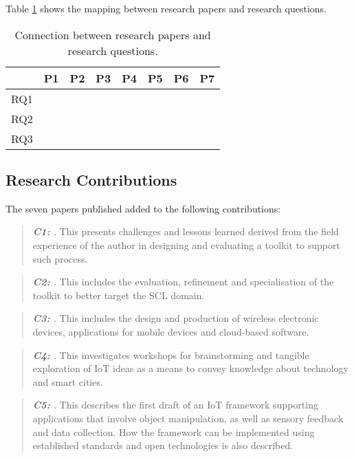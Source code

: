 Table \ref{tab:rq-papers-relation} shows the mapping between research papers and research questions.

\begin{table}
	[tbh] \centering \caption{Connection between research papers and research questions.} \label{tab:rq-papers-relation}
	\begin{tabular}
		{cccccccc} \toprule  & P1 & P2 & P3 & P4 & P5 & P6 & P7 \\
		\midrule 
		RQ1 & & \textbullet & \textbullet & & & \textbullet & \textbullet \\
		RQ2 & \textbullet & \textbullet & \textbullet & \textbullet & \textbullet & &  \\
		RQ3 & & & & & & \textbullet & \textbullet \\
		\bottomrule
	\end{tabular}
\end{table}


\subsection{Research Contributions}
\label{sub:research-contributions}

The seven papers published added to the following contributions:

\begin{quote}
	\emph{\textbf{C1:} \Ci.} This presents challenges and lessons learned derived from the field experience of the author in designing and evaluating a toolkit to support such process.
\end{quote}
\begin{quote}
	\emph{\textbf{C2:} \Cii.} This includes the evaluation, refinement and specialisation of the toolkit to better target the SCL domain. 
\end{quote}
\begin{quote}
	\emph{\textbf{C3:} \Ciii.} This includes the design and production of wireless electronic devices, applications for mobile devices and cloud-based software. 
\end{quote}
\begin{quote}
	\emph{\textbf{C4:} \Civ.} This investigates workshops for brainstorming and tangible exploration of IoT ideas as a means to convey knowledge about technology and smart cities.
\end{quote}
\begin{quote}
	\emph{\textbf{C5:} \Cv.} This describes the first draft of an IoT framework supporting applications that involve object manipulation, as well as sensory feedback and data collection. How the framework can be implemented using established standards and open technologies is also described.
\end{quote}



